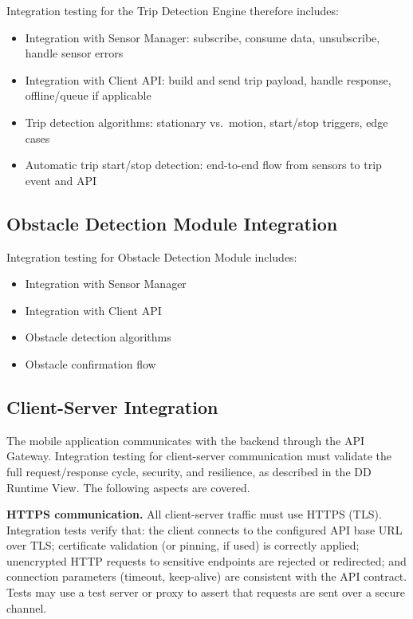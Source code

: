 Integration testing for the Trip Detection Engine therefore includes:
\begin{itemize}
    \item Integration with Sensor Manager: subscribe, consume data, unsubscribe, handle sensor errors
    \item Integration with Client API: build and send trip payload, handle response, offline/queue if applicable
    \item Trip detection algorithms: stationary vs.\ motion, start/stop triggers, edge cases
    \item Automatic trip start/stop detection: end-to-end flow from sensors to trip event and API
\end{itemize}

\subsection{Obstacle Detection Module Integration}
\label{subsec:obstacle_detection_module_integration}%

Integration testing for Obstacle Detection Module includes:
\begin{itemize}
    \item Integration with Sensor Manager
    \item Integration with Client API
    \item Obstacle detection algorithms
    \item Obstacle confirmation flow
\end{itemize}

\subsection{Client-Server Integration}
\label{subsec:client_server_integration}%

The mobile application communicates with the backend through the API Gateway. Integration testing for client-server communication must validate the full request/response cycle, security, and resilience, as described in the DD Runtime View. The following aspects are covered.

\textbf{HTTPS communication.}
All client-server traffic must use HTTPS (TLS). Integration tests verify that: the client connects to the configured API base URL over TLS; certificate validation (or pinning, if used) is correctly applied; unencrypted HTTP requests to sensitive endpoints are rejected or redirected; and connection parameters (timeout, keep-alive) are consistent with the API contract. Tests may use a test server or proxy to assert that requests are sent over a secure channel.

